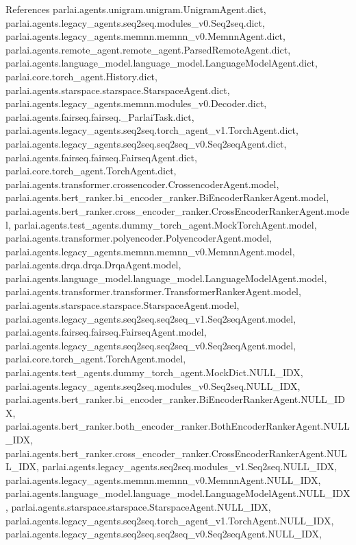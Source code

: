 References parlai.\+agents.\+unigram.\+unigram.\+Unigram\+Agent.\+dict, parlai.\+agents.\+legacy\+\_\+agents.\+seq2seq.\+modules\+\_\+v0.\+Seq2seq.\+dict, parlai.\+agents.\+legacy\+\_\+agents.\+memnn.\+memnn\+\_\+v0.\+Memnn\+Agent.\+dict, parlai.\+agents.\+remote\+\_\+agent.\+remote\+\_\+agent.\+Parsed\+Remote\+Agent.\+dict, parlai.\+agents.\+language\+\_\+model.\+language\+\_\+model.\+Language\+Model\+Agent.\+dict, parlai.\+core.\+torch\+\_\+agent.\+History.\+dict, parlai.\+agents.\+starspace.\+starspace.\+Starspace\+Agent.\+dict, parlai.\+agents.\+legacy\+\_\+agents.\+memnn.\+modules\+\_\+v0.\+Decoder.\+dict, parlai.\+agents.\+fairseq.\+fairseq.\+\_\+\+Parlai\+Task.\+dict, parlai.\+agents.\+legacy\+\_\+agents.\+seq2seq.\+torch\+\_\+agent\+\_\+v1.\+Torch\+Agent.\+dict, parlai.\+agents.\+legacy\+\_\+agents.\+seq2seq.\+seq2seq\+\_\+v0.\+Seq2seq\+Agent.\+dict, parlai.\+agents.\+fairseq.\+fairseq.\+Fairseq\+Agent.\+dict, parlai.\+core.\+torch\+\_\+agent.\+Torch\+Agent.\+dict, parlai.\+agents.\+transformer.\+crossencoder.\+Crossencoder\+Agent.\+model, parlai.\+agents.\+bert\+\_\+ranker.\+bi\+\_\+encoder\+\_\+ranker.\+Bi\+Encoder\+Ranker\+Agent.\+model, parlai.\+agents.\+bert\+\_\+ranker.\+cross\+\_\+encoder\+\_\+ranker.\+Cross\+Encoder\+Ranker\+Agent.\+model, parlai.\+agents.\+test\+\_\+agents.\+dummy\+\_\+torch\+\_\+agent.\+Mock\+Torch\+Agent.\+model, parlai.\+agents.\+transformer.\+polyencoder.\+Polyencoder\+Agent.\+model, parlai.\+agents.\+legacy\+\_\+agents.\+memnn.\+memnn\+\_\+v0.\+Memnn\+Agent.\+model, parlai.\+agents.\+drqa.\+drqa.\+Drqa\+Agent.\+model, parlai.\+agents.\+language\+\_\+model.\+language\+\_\+model.\+Language\+Model\+Agent.\+model, parlai.\+agents.\+transformer.\+transformer.\+Transformer\+Ranker\+Agent.\+model, parlai.\+agents.\+starspace.\+starspace.\+Starspace\+Agent.\+model, parlai.\+agents.\+legacy\+\_\+agents.\+seq2seq.\+seq2seq\+\_\+v1.\+Seq2seq\+Agent.\+model, parlai.\+agents.\+fairseq.\+fairseq.\+Fairseq\+Agent.\+model, parlai.\+agents.\+legacy\+\_\+agents.\+seq2seq.\+seq2seq\+\_\+v0.\+Seq2seq\+Agent.\+model, parlai.\+core.\+torch\+\_\+agent.\+Torch\+Agent.\+model, parlai.\+agents.\+test\+\_\+agents.\+dummy\+\_\+torch\+\_\+agent.\+Mock\+Dict.\+N\+U\+L\+L\+\_\+\+I\+DX, parlai.\+agents.\+legacy\+\_\+agents.\+seq2seq.\+modules\+\_\+v0.\+Seq2seq.\+N\+U\+L\+L\+\_\+\+I\+DX, parlai.\+agents.\+bert\+\_\+ranker.\+bi\+\_\+encoder\+\_\+ranker.\+Bi\+Encoder\+Ranker\+Agent.\+N\+U\+L\+L\+\_\+\+I\+DX, parlai.\+agents.\+bert\+\_\+ranker.\+both\+\_\+encoder\+\_\+ranker.\+Both\+Encoder\+Ranker\+Agent.\+N\+U\+L\+L\+\_\+\+I\+DX, parlai.\+agents.\+bert\+\_\+ranker.\+cross\+\_\+encoder\+\_\+ranker.\+Cross\+Encoder\+Ranker\+Agent.\+N\+U\+L\+L\+\_\+\+I\+DX, parlai.\+agents.\+legacy\+\_\+agents.\+seq2seq.\+modules\+\_\+v1.\+Seq2seq.\+N\+U\+L\+L\+\_\+\+I\+DX, parlai.\+agents.\+legacy\+\_\+agents.\+memnn.\+memnn\+\_\+v0.\+Memnn\+Agent.\+N\+U\+L\+L\+\_\+\+I\+DX, parlai.\+agents.\+language\+\_\+model.\+language\+\_\+model.\+Language\+Model\+Agent.\+N\+U\+L\+L\+\_\+\+I\+DX, parlai.\+agents.\+starspace.\+starspace.\+Starspace\+Agent.\+N\+U\+L\+L\+\_\+\+I\+DX, parlai.\+agents.\+legacy\+\_\+agents.\+seq2seq.\+torch\+\_\+agent\+\_\+v1.\+Torch\+Agent.\+N\+U\+L\+L\+\_\+\+I\+DX, parlai.\+agents.\+legacy\+\_\+agents.\+seq2seq.\+seq2seq\+\_\+v0.\+Seq2seq\+Agent.\+N\+U\+L\+L\+\_\+\+I\+DX, 